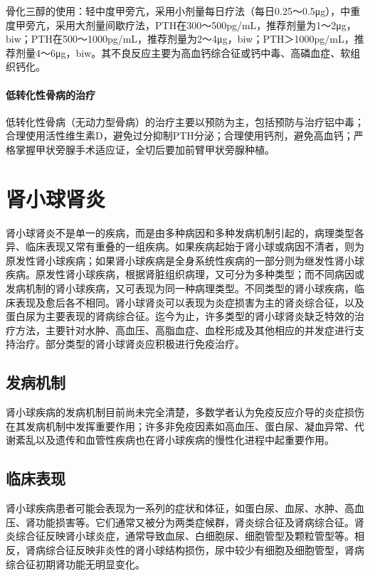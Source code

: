 骨化三醇的使用：轻中度甲旁亢，采用小剂量每日疗法（每日0.25～0.5μg），中重度甲旁亢，采用大剂量间歇疗法，PTH在300～500pg/mL，推荐剂量为1～2μg，biw；PTH在500～1000pg/mL，推荐剂量为2～4μg，biw；PTH＞1000pg/mL，推荐剂量4～6μg，biw。其不良反应主要为高血钙综合征或钙中毒、高磷血症、软组织钙化。
\paragraph{低转化性骨病的治疗}

低转化性骨病（无动力型骨病）的治疗主要以预防为主，包括预防与治疗铝中毒；合理使用活性维生素D，避免过分抑制PTH分泌；合理使用钙剂，避免高血钙；严格掌握甲状旁腺手术适应证，全切后要加前臂甲状旁腺种植。

\section{肾小球肾炎}

肾小球肾炎不是单一的疾病，而是由多种病因和多种发病机制引起的，病理类型各异、临床表现又常有重叠的一组疾病。如果疾病起始于肾小球或病因不清者，则为原发性肾小球疾病；如果肾小球疾病是全身系统性疾病的一部分则为继发性肾小球疾病。原发性肾小球疾病，根据肾脏组织病理，又可分为多种类型；而不同病因或发病机制的肾小球疾病，又可表现为同一种病理类型。不同类型的肾小球疾病，临床表现及愈后各不相同。肾小球肾炎可以表现为炎症损害为主的肾炎综合征，以及蛋白尿为主要表现的肾病综合征。迄今为止，许多类型的肾小球肾炎缺乏特效的治疗方法，主要针对水肿、高血压、高脂血症、血栓形成及其他相应的并发症进行支持治疗。部分类型的肾小球肾炎应积极进行免疫治疗。

\subsection{发病机制}

肾小球疾病的发病机制目前尚未完全清楚，多数学者认为免疫反应介导的炎症损伤在其发病机制中发挥重要作用；许多非免疫因素如高血压、蛋白尿、凝血异常、代谢紊乱以及遗传和血管性疾病也在肾小球疾病的慢性化进程中起重要作用。

\subsection{临床表现}

肾小球疾病患者可能会表现为一系列的症状和体征，如蛋白尿、血尿、水肿、高血压、肾功能损害等。它们通常又被分为两类症候群，肾炎综合征及肾病综合征。肾炎综合征反映肾小球炎症，通常导致血尿、白细胞尿、细胞管型及颗粒管型等。相反，肾病综合征反映非炎性的肾小球结构损伤，尿中较少有细胞及细胞管型，肾病综合征初期肾功能无明显变化。

